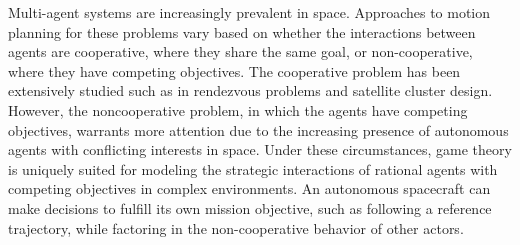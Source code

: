 
Multi-agent systems are increasingly prevalent in space.
Approaches to motion planning for these problems vary based on whether the interactions between agents are cooperative, where they share the same goal, or non-cooperative, where they have competing objectives.
The cooperative problem has been extensively studied  such as in rendezvous problems and satellite cluster design. 
However, the noncooperative problem, in which the agents have competing objectives, 
warrants more attention due to the increasing presence of autonomous agents with conflicting interests in space.
Under these circumstances, game theory is uniquely suited for modeling the strategic interactions of rational agents with competing objectives in complex environments.
An autonomous spacecraft can make decisions to fulfill its own mission objective, such as following a reference trajectory, while factoring in the non-cooperative behavior of other actors.

